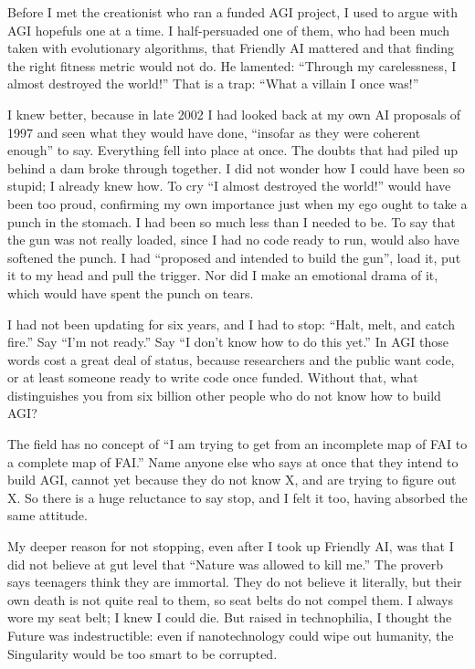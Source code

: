 
Before I met the creationist who ran a funded AGI project, I used to argue with AGI hopefuls one at a time. I half-persuaded one of them, who had been much taken with evolutionary algorithms, that Friendly AI mattered and that finding the right fitness metric would not do. He lamented: ``Through my carelessness, I almost destroyed the world!'' That is a trap: ``What a villain I once was!''

I knew better, because in late 2002 I had looked back at my own AI proposals of 1997 and seen what they would have done, ``insofar as they were coherent enough'' to say. Everything fell into place at once. The doubts that had piled up behind a dam broke through together. I did not wonder how I could have been so stupid; I already knew how. To cry ``I almost destroyed the world!'' would have been too proud, confirming my own importance just when my ego ought to take a punch in the stomach. I had been so much less than I needed to be. To say that the gun was not really loaded, since I had no code ready to run, would also have softened the punch. I had ``proposed and intended to build the gun'', load it, put it to my head and pull the trigger. Nor did I make an emotional drama of it, which would have spent the punch on tears. 

I had not been updating for six years, and I had to stop: ``Halt, melt, and catch fire.'' Say ``I'm not ready.'' Say ``I don't know how to do this yet.'' In AGI those words cost a great deal of status, because researchers and the public want code, or at least someone ready to write code once funded. Without that, what distinguishes you from six billion other people who do not know how to build AGI?

The field has no concept of ``I am trying to get from an incomplete map of FAI to a complete map of FAI.'' Name anyone else who says at once that they intend to build AGI, cannot yet because they do not know X, and are trying to figure out X. So there is a huge reluctance to say stop, and I felt it too, having absorbed the same attitude. 

My deeper reason for not stopping, even after I took up Friendly AI, was that I did not believe at gut level that ``Nature was allowed to kill me.'' The proverb says teenagers think they are immortal. They do not believe it literally, but their own death is not quite real to them, so seat belts do not compel them. I always wore my seat belt; I knew I could die. But raised in technophilia, I thought the Future was indestructible: even if nanotechnology could wipe out humanity, the Singularity would be too smart to be corrupted. 

